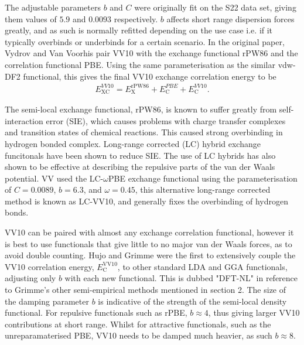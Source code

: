 \documentclass[10pt,a4paper,twocolumn,twoside]{extarticle}
\begin{document}
	The adjustable parameters $b$ and $C$ were originally fit on the S22 data set, giving them values of $5.9$ and $0.0093$ respectively.\cite{Vydrov2012} $b$ affects short range dispersion forces greatly, and as such is normally refitted depending on the use case i.e. if it typically overbinds or underbinds for a certain scenario.
	In the original paper, Vydrov and Van Voorhis pair VV10 with the exchange functional rPW86 and the correlation functional PBE. Using the same parameterisation as the similar vdw-DF2 functional, this gives the final VV10 exchange correlation energy to be 
	\begin{align}
		E_\text{XC}^{VV10} = E_\text{X}^\text{rPW86} + E_\text{C}^{PBE} + E_\text{C}^{VV10}.
	\end{align} 

	The semi-local exchange functional, rPW86, is known to suffer greatly from self-interaction error (SIE), which causes problems with charge transfer complexes and transition states of chemical reactions. This caused strong overbinding in hydrogen bonded complex.\cite{Vydrov2012} Long-range corrected (LC) hybrid exchange funcitonals have been shown to reduce SIE.\cite{vydrov2006-LC-Hybrids} The use of LC hybrids has also shown to be effective at describing the repulsive parts of the van der Waals potential.\cite{sato2007-LC-Hybrids} VV used the LC-$\omega$PBE exchange functional using the parameterisation of $C = 0.0089$, $b = 6.3$, and $\omega = 0.45$, this alternative long-range corrected method is known as LC-VV10, and generally fixes the overbinding of hydrogen bonds.

	VV10 can be paired with almost any exchange correlation functional, however it is best to use functionals that give little to no major van der Waals forces, as to avoid double counting.
	Hujo and Grimme were the first to extensively couple the VV10 correlation energy, $E_\text{C}^\text{VV10}$, to other standard LDA and GGA functionals, adjusting only $b$ with each new functional.\cite{Grimme2011-VV10-LDA-GGA-Pairing} This is dubbed "DFT-NL" in reference to Grimme's other semi-empirical methods mentioned in section 2. The size of the damping parameter $b$ is indicative of the strength of the semi-local density functional. For repulsive functionals such as rPBE, $b \approx 4$, thus giving larger VV10 contributions at short range. Whilst for attractive functionals, such as the unreparamaterised PBE, VV10 needs to be damped much heavier, as such $b \approx 8$.\cite{Grimme2011}
	
\end{document}
